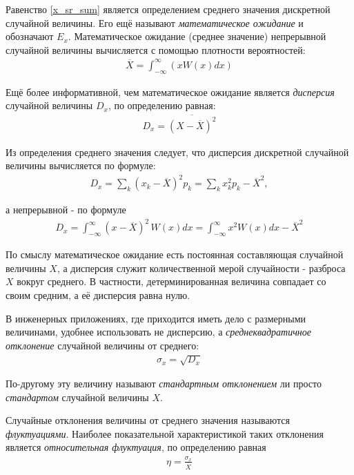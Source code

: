  Равенство \eqref{x_sr_sum} является определением среднего значения дискретной случайной величины. Его ещё называют \textit{математическое ожидание} и обозначают $E_x$.
 Математическое ожидание (среднее значение) непрерывной случайной величины вычисляется с помощью плотности вероятностей:
  \begin{align*} \tag{12b} \label{x_sr_int}
 	\overline X = \int_{ -\infty }^{ \infty } (x W(x) dx)
 \end{align*}
 
 Ещё более информативной, чем математическое ожидание является \textit{дисперсия} случайной величины $D_x$, по определению равная:
 \begin{align} 
 	D_x = \overline{(X - \overline{X})^2}
 \end{align}

Из определения среднего значения следует, что дисперсия дискретной случайной величины вычисляется по формуле:
\begin{align} \tag{13a}
	D_x = \sum_{k} { (x_k - \overline{X})^2 p_k } = \sum_{k} { x_k^2 p_k - \overline{X}^2 },
\end{align}

а непрерывной - по формуле
\begin{align} \tag{13b}
	D_x = \int_{-\infty}^{\infty} { (x - \overline{X})^2 \, W(x) dx } = \int_{-\infty}^{\infty} { x^2 W(x) dx } - \overline{X}^2
\end{align}

По смыслу математическое ожидание есть постоянная составляющая случайной величины $X$, а дисперсия служит количественной мерой случайности - разброса $X$ вокруг среднего. В частности, детерминированная величина совпадает со своим средним, а её дисперсия равна нулю.

В инженерных приложениях, где приходится иметь дело с размерными величинами, удобнее использовать не дисперсию, а \textit{среднеквадратичное отклонение} случайной величины от среднего:
\begin{align}
	\sigma_x = \sqrt{D_x}
\end{align}

По-другому эту величину называют \textit{стандартным отклонением} ли просто \textit{стандартом} случайной величины $X$.

Случайные отклонения величины от среднего значения называются \textit{флуктуациями}. Наиболее показательной характеристикой таких отклонения является \textit{относительная флуктуация}, по определению равная
\begin{align}
	\eta = \frac{\sigma_x}{\overline{X}}
\end{align}

